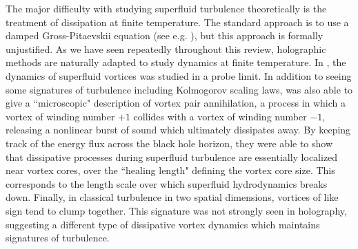 \documentclass[10pt, oneside]{book}
\begin{document}
\begin{doublespace}
The major  difficulty with studying superfluid turbulence theoretically is the treatment of dissipation at finite temperature.   The standard approach is to use a damped Gross-Pitaevskii equation (see e.g. \cite{billam}),  but this approach is formally unjustified.    As we have seen repeatedly throughout this review, holographic methods are naturally adapted to study dynamics at finite temperature.   In \cite{Adams:2012pj},  the dynamics of superfluid vortices was studied in a probe limit.   In addition to seeing some signatures of turbulence including Kolmogorov scaling laws,  \cite{Adams:2012pj} was also able to give a ``microscopic" description of vortex pair annihilation, a process in which a vortex of winding number $+1$ collides with a vortex of winding number $-1$, releasing a nonlinear burst of sound which ultimately dissipates away.    By keeping track of the energy flux across the black hole horizon, they were able to show that dissipative processes during superfluid turbulence are essentially localized near vortex cores, over the ``healing length" defining the vortex core size.   This corresponds to the length scale over which superfluid hydrodynamics breaks down.   Finally, in classical turbulence in two spatial dimensions, vortices of like sign tend to clump together.   This signature was not strongly seen in holography, suggesting a different type of dissipative vortex dynamics which maintains signatures of turbulence.


\end{doublespace}
\end{document}
